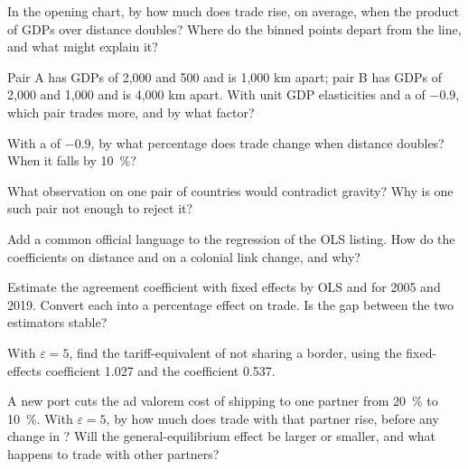 \begin{exercise}[$\star$]\label{exo:b3:gravity:1}
In the opening chart, by how much does trade rise, on average, when the product
of GDPs over distance doubles? Where do the binned points depart from the line,
and what might explain it?
\end{exercise}

\begin{exercise}[$\star$]\label{exo:b3:gravity:2}
Pair A has GDPs of 2{,}000 and 500 and is 1{,}000 km apart; pair B has GDPs of
2{,}000 and 1{,}000 and is 4{,}000 km apart. With unit GDP elasticities and a  of $-0.9$, which pair trades more, and by what factor?
\end{exercise}

\begin{exercise}[$\star$]\label{exo:b3:gravity:3}
With a  of $-0.9$, by what percentage does trade change when
distance doubles? When it falls by 10~\%?
\end{exercise}

\begin{exercise}[$\star$]\label{exo:b3:gravity:4}
What observation on one pair of countries would contradict gravity? Why is one
such pair not enough to reject it?
\end{exercise}

\begin{exercise}[$\star\star$]\label{exo:b3:gravity:5}
Add a common official language to the regression of the OLS listing. How do the
coefficients on distance and on a colonial link change, and why?
\end{exercise}

\begin{exercise}[$\star\star$]\label{exo:b3:gravity:6}
Estimate the agreement coefficient with fixed effects by OLS and  for 2005
and 2019. Convert each into a percentage effect on trade. Is the gap between the
two estimators stable?
\end{exercise}

\begin{exercise}[$\star\star$]\label{exo:b3:gravity:7}
With $\varepsilon = 5$, find the tariff-equivalent of not sharing a border, using the
fixed-effects coefficient 1.027 and the  coefficient 0.537.
\end{exercise}

\begin{exercise}[$\star\star$]\label{exo:b3:gravity:8}
A new port cuts the ad valorem cost of shipping to one partner from 20~\% to 10~\%.
With $\varepsilon = 5$, by how much does trade with that partner rise, before any change in
? Will the general-equilibrium effect be larger or smaller,
and what happens to trade with other partners?
\end{exercise}

